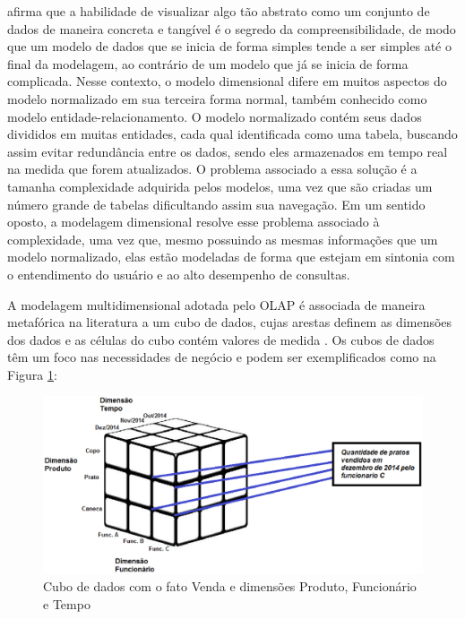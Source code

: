  afirma que a habilidade de visualizar algo tão abstrato como um conjunto de dados  de maneira concreta e tangível é o segredo da compreensibilidade, de modo que um modelo de dados que se inicia de forma simples tende a ser simples até o final da modelagem, ao contrário de um modelo que já se inicia de forma complicada. Nesse contexto, o modelo dimensional difere em muitos aspectos do modelo normalizado em sua terceira forma normal, também conhecido como modelo entidade-relacionamento. O modelo normalizado contém seus dados divididos em muitas entidades, cada qual identificada como uma tabela, buscando assim evitar redundância entre os dados, sendo eles armazenados em tempo real na medida que forem atualizados. O problema associado a essa solução é a tamanha complexidade adquirida pelos modelos, uma vez que são criadas um número grande de tabelas dificultando assim sua navegação. Em um sentido oposto, a modelagem dimensional resolve esse problema associado à complexidade, uma vez que, mesmo possuindo as mesmas informações que um modelo normalizado, elas estão modeladas de forma que estejam em sintonia com o entendimento do usuário e ao alto desempenho de consultas. 

 
A modelagem multidimensional adotada pelo OLAP é associada de maneira metafórica na literatura a um cubo de dados, cujas arestas definem as dimensões dos dados e as células do cubo contém valores de medida \cite{Kimball2002}. Os cubos de dados têm um foco nas necessidades de negócio e podem ser exemplificados como na Figura \ref{fig:cubo}:

\begin{figure}[h!]
\centering
\includegraphics[keepaspectratio=false,scale=0.60]{figuras/figuras_matheus/cubo.eps}
\caption{Cubo de dados com o fato Venda e dimensões Produto, Funcionário e Tempo}
\label{fig:cubo}
\end{figure}
\FloatBarrier

